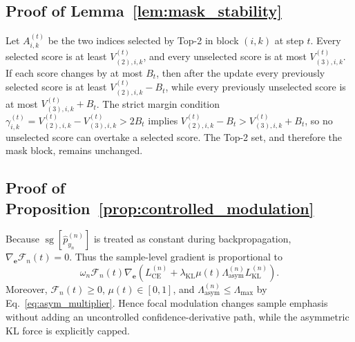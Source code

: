 \documentclass[letterpaper]{article} %
\begin{document}
\subsection{Proof of Lemma~\ref{lem:mask_stability}}
Let $A_{i,k}^{(t)}$ be the two indices selected by Top-2 in block $(i,k)$ at step $t$. Every selected score is at least $V_{(2),i,k}^{(t)}$, and every unselected score is at most $V_{(3),i,k}^{(t)}$. If each score changes by at most $B_t$, then after the update every previously selected score is at least $V_{(2),i,k}^{(t)}-B_t$, while every previously unselected score is at most $V_{(3),i,k}^{(t)}+B_t$. The strict margin condition $\gamma_{i,k}^{(t)}=V_{(2),i,k}^{(t)}-V_{(3),i,k}^{(t)}>2B_t$ implies $V_{(2),i,k}^{(t)}-B_t>V_{(3),i,k}^{(t)}+B_t$, so no unselected score can overtake a selected score. The Top-2 set, and therefore the mask block, remains unchanged.

\subsection{Proof of Proposition~\ref{prop:controlled_modulation}}
Because $\operatorname{sg}[\hat{p}_{y_n}^{(n)}]$ is treated as constant during backpropagation, $\nabla_{\bm{e}}\mathcal{F}_n(t)=0$. Thus the sample-level gradient is proportional to
\begin{equation}
    \omega_n\mathcal{F}_n(t)
    \nabla_{\bm{e}}\!\left(
    L_{\text{CE}}^{(n)}
    +\lambda_{\text{KL}}\mu(t)\Lambda_{\text{asym}}^{(n)}
    L_{\text{KL}}^{(n)}
    \right).
\end{equation}
Moreover, $\mathcal{F}_n(t)\ge0$, $\mu(t)\in[0,1]$, and $\Lambda_{\text{asym}}^{(n)}\le\Lambda_{\max}$ by Eq.~\ref{eq:asym_multiplier}. Hence focal modulation changes sample emphasis without adding an uncontrolled confidence-derivative path, while the asymmetric KL force is explicitly capped.

\FloatBarrier
\end{document}
